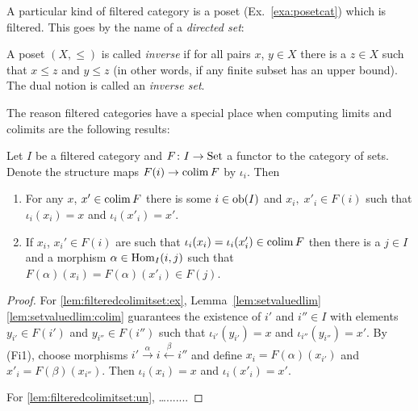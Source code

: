 \documentclass[a4paper,openany]{scrbook}
\begin{document}
A particular kind of filtered category is a poset (Ex.~\ref{exa:posetcat}) which is filtered. This goes by the name of a \emph{directed set}:

\begin{defn}
A poset $(X,\leq)$ is called \emph{inverse} if for all pairs $x$, $y \in X$ there is a $z \in X$ such that $x \leq z$ and $y \leq z$ (in other words, if any finite subset has an upper bound). The dual notion is called an \emph{inverse set}.
\end{defn}

The reason filtered categories have a special place when computing limits and colimits are the following results:

\begin{lemma} \label{lem:filteredcolimitset}
Let $I$ be a filtered category and $F\colon I \to \operatorname{Set}$ a functor to the category of sets. Denote the structure maps $F(i) \to \colim F$ by $\iota_i$. Then
\begin{enumerate}
\item For any $x$, $x' \in \colim F$ there is some $i \in \operatorname{ob}(I)$ and $x_i,\; x'_i \in F(i)$ such that $\iota_i(x_i)=x$ and $\iota_i(x'_i)=x'$. \label{lem:filteredcolimitset:ex}
\item If $x_i$, $x_i' \in F(i)$ are such that $\iota_i(x_i) = \iota_i(x'_i) \in \colim F$ then there is a $j \in I$ and a morphism $\alpha \in \operatorname{Hom}_I(i,j)$ such that $F(\alpha)(x_i) = F(\alpha)(x'_i) \in F(j)$. \label{lem:filteredcolimitset:un}
\end{enumerate}
\end{lemma}
\begin{proof}
For \eqref{lem:filteredcolimitset:ex}, Lemma~\ref{lem:setvaluedlim}\eqref{lem:setvaluedlim:colim} guarantees the existence of $i'$ and $i'' \in I$ with elements $y_{i'} \in F(i')$ and $y_{i''} \in F(i'')$ such that $\iota_{i'}(y_{i'}) = x$ and $\iota_{i''}(y_{i''}) = x'$. By (Fi1), choose morphisms $i' \xrightarrow{\alpha} i \xleftarrow{\beta} i''$ and define $x_i = F(\alpha)(x_{i'})$ and $x'_i = F(\beta)(x_{i''})$. Then $\iota_i(x_i)=x$ and $\iota_i(x'_i)=x'$.

For \eqref{lem:filteredcolimitset:un}, \dots.......

\end{proof}
\end{document}
